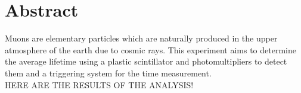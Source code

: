 \thispagestyle{plain}
\section*{Abstract}
Muons are elementary particles which are naturally produced in the upper atmosphere of the earth due 
to cosmic rays. This experiment aims to determine the average lifetime using a plastic scintillator and
photomultipliers to detect them and a triggering system for the time measurement.\\
HERE ARE THE RESULTS OF THE ANALYSIS!
